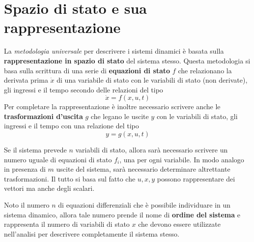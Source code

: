 \section{Spazio di stato e sua rappresentazione} \label{sec:intro:spaziostato}
	\begin{concetto}
		La \textit{metodologia universale} per descrivere i sistemi dinamici è basata sulla \textbf{rappresentazione in spazio di stato} del sistema stesso. Questa metodologia si basa sulla scrittura di una serie di \textbf{equazioni di stato} $f$ che relazionano la derivata prima $\dot x$ di una variabile di stato con le variabili di stato (non derivate), gli ingressi e il tempo secondo delle relazioni del tipo
		\[ \dot x = f( x,u,t)\]
		Per completare la rappresentazione è inoltre necessario scrivere anche le \textbf{trasformazioni d'uscita} $g$ che legano le uscite $y$ con le variabili di stato, gli ingressi e il tempo con una relazione del tipo
		\[ y = g(x,u,t)  \]
	\end{concetto}
	\begin{osservazione}
		Se il sistema prevede $n$ variabili di stato, allora sarà necessario scrivere un numero uguale di equazioni di stato $f_i$, una per ogni variabile. In modo analogo in presenza di $m$ uscite del sistema, sarà necessario determinare altrettante trasformazioni. Il tutto si basa sul fatto che $u,x,y$ possono rappresentare dei vettori ma anche degli scalari.
	\end{osservazione}
	Noto il numero $n$ di equazioni differenziali che è possibile individuare in un sistema dinamico, allora tale numero prende il nome di \textbf{ordine del sistema} e rappresenta il numero di variabili di stato $x$ che devono essere utilizzate nell'analisi per descrivere completamente il sistema stesso.
	
